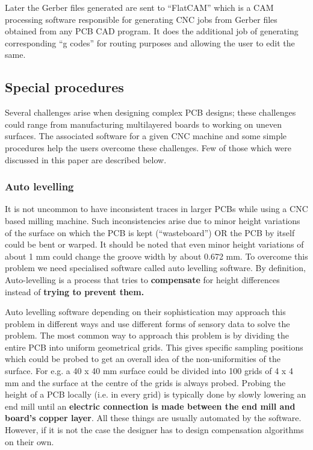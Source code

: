 Later the Gerber files generated are sent to “FlatCAM” which is a CAM processing software responsible for generating CNC jobs from Gerber files obtained from any PCB CAD program. It does the additional job of generating corresponding “g codes” for routing purposes and allowing the user to edit the same.


\subsection{Special procedures} \label{spec_proc}

Several challenges arise when designing complex PCB designs; these challenges could range from manufacturing multilayered boards to working on uneven surfaces. The associated software for a given CNC machine and some simple procedures help the users overcome these challenges. Few of those which were discussed in this paper are described below.

\subsubsection*{Auto levelling}
It is not uncommon to have inconsistent traces in larger PCBs while using a CNC based milling machine. Such inconsistencies arise due to minor height variations of the surface on which the PCB is kept (“wasteboard”) OR the PCB by itself could be bent or warped. It should be noted that even minor height variations of about 1 mm could change the groove width by about 0.672 mm.  To overcome this problem we need specialised software called auto levelling software. By definition, Auto-levelling is a process that tries to \textbf{compensate} for height differences instead of \textbf{trying to prevent them.} \par

Auto levelling software depending on their sophistication may approach this problem in different ways and use different forms of sensory data to solve the problem. The most common way to approach this problem is by dividing the entire PCB into uniform geometrical grids. This gives specific sampling positions which could be probed to get an overall idea of the non-uniformities of the surface. For e.g. a 40 x 40 mm surface could be divided into 100 grids of 4 x 4 mm and the surface at the centre of the grids is always probed.  Probing the height of a PCB locally (i.e. in every grid) is typically done by slowly lowering an end mill until an \textbf{electric connection is made between the end mill and board’s copper layer}. All these things are usually automated by the software. However, if it is not the case the designer has to design compensation algorithms on their own. \par


